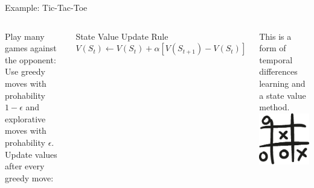 \documentclass{beamer}
\begin{document}
\begin{frame}{Example: Tic-Tac-Toe}
	\begin{columns}
		Play many games against the opponent: Use greedy moves with prohability $1 - \epsilon$ and explorative moves with prohability $\epsilon$.
		Update values after every greedy move:\\
	\vspace{0.5cm}
	\begin{alertblock}{State Value Update Rule}
		$V(S_t) \leftarrow V(S_t) + \alpha[V(S_{t+1}) - V(S_{t})]$\\
	\end{alertblock}
		This is a form of temporal differences learning and a state value method.
		\includegraphics[width=\linewidth]{Images/tic-tac-toe-hand-drawn-game.eps}\\
	\end{columns}
\end{frame}
\end{document}
